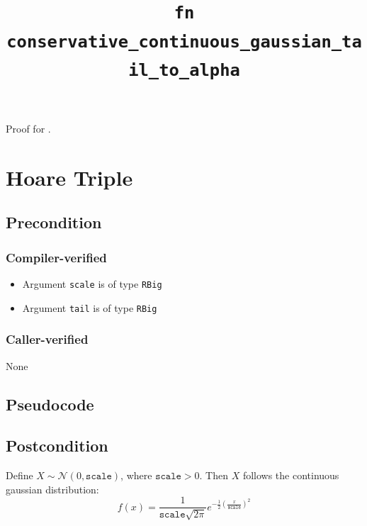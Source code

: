 \documentclass{article}
\title{\texttt{fn conservative\_continuous\_gaussian\_tail\_to\_alpha}}
\author{\MichaelShoemateAuthor}
\begin{document}
\maketitle

Proof for .


\section{Hoare Triple}
\subsection*{Precondition}
\subsubsection*{Compiler-verified}
\begin{itemize}
    \item Argument \texttt{scale} is of type \texttt{RBig}
    \item Argument \texttt{tail} is of type \texttt{RBig}
\end{itemize}

\subsubsection*{Caller-verified}
None


\subsection*{Pseudocode}


\subsection*{Postcondition}

\begin{definition}
    \label{gaussian}
    Define $X \sim \mathcal{N}(0, \texttt{scale})$, where $\texttt{scale} > 0$. Then $X$ follows the continuous gaussian distribution:
    \begin{equation}
        f(x) = \frac{1}{\texttt{scale} \sqrt{2 \pi}} e^{-\frac{1}{2}\left( \frac{x}{\texttt{scale}}\right)^2}
    \end{equation}
\end{definition}
\end{document}
